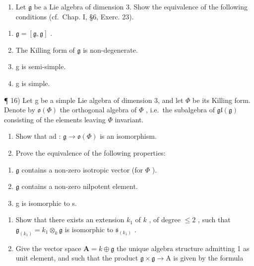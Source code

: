 \begin{enumerate}
\def\labelenumi{\arabic{enumi})}
\setcounter{enumi}{14}
\tightlist
\item
  Let \(\mathfrak{g}\) be a Lie algebra of dimension 3. Show the equivalence of the following conditions (cf.~Chap. I, §6, Exerc. 23).
\end{enumerate}

\begin{enumerate}
\def\labelenumi{(\roman{enumi})}
\item
  \(\mathfrak{g} = [\mathfrak{g},\mathfrak{g}]\) .
\item
  The Killing form of \(\mathfrak{g}\) is non-degenerate.
\item
  g is semi-simple.
\item
  g is simple.
\end{enumerate}

¶ 16) Let g be a simple Lie algebra of dimension 3, and let \(\Phi\) be its Killing form. Denote by \(\mathfrak{o}(\Phi)\) the orthogonal algebra of \(\Phi\) , i.e.~the subalgebra of \(\mathfrak{gl}(\mathfrak{g})\) consisting of the elements leaving \(\Phi\) invariant.

\begin{enumerate}
\def\labelenumi{\alph{enumi})}
\item
  Show that ad : \(\mathfrak{g} \to \mathfrak{o}(\varPhi)\) is an isomorphism.
\item
  Prove the equivalence of the following properties:
\end{enumerate}

\begin{enumerate}
\def\labelenumi{(\roman{enumi})}
\item
  \(\mathfrak{g}\) contains a non-zero isotropic vector (for \(\varPhi\) ).
\item
  \(\mathfrak{g}\) contains a non-zero nilpotent element.
\item
  g is isomorphic to s.
\end{enumerate}

\begin{enumerate}
\def\labelenumi{\alph{enumi})}
\setcounter{enumi}{2}
\item
  Show that there exists an extension \(k_{1}\) of \(k\) , of degree \(\leq 2\) , such that \(\mathfrak{g}_{(k_1)} = k_1 \otimes_k \mathfrak{g}\) is isomorphic to \(\mathfrak{s}_{(k_1)}\) .
\item
  Give the vector space \(\mathbf{A} = k\oplus \mathfrak{g}\) the unique algebra structure admitting 1 as unit element, and such that the product \(\mathfrak{g}\times \mathfrak{g}\to \mathrm{A}\) is given by the formula
\end{enumerate}

